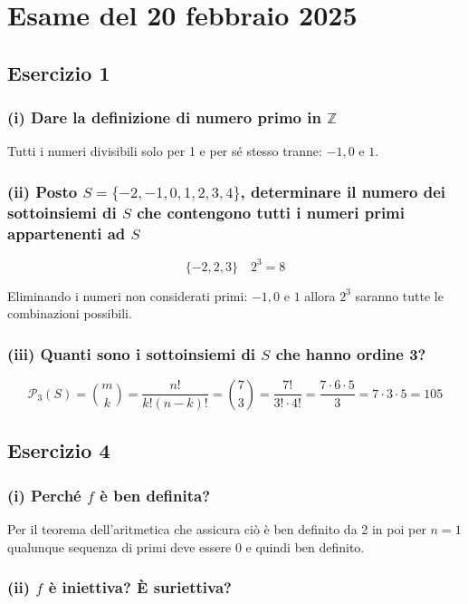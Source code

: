 \section {Esame del 20 febbraio 2025}

\subsection*{Esercizio 1}

\subsubsection*{(i) Dare la definizione di numero primo in $\mathbb{Z}$}

Tutti i numeri divisibili solo per 1 e per sé stesso tranne: $-1, 0$ e $1$.

\subsubsection*{(ii) Posto $S = \{-2, -1, 0, 1, 2, 3, 4\}$, determinare il numero dei sottoinsiemi di $S$ che contengono tutti i numeri primi appartenenti ad $S$}

$$\{-2, 2, 3\} \quad 2^3 = 8$$

Eliminando i numeri non considerati primi: $-1, 0$ e $1$ allora $2^3$ saranno tutte le combinazioni possibili.

\subsubsection*{(iii) Quanti sono i sottoinsiemi di $S$ che hanno ordine 3?}

$$\mathcal{P}_3(S) = \binom{m}{k} = \frac{n!}{k!(n-k)!} = \binom{7}{3} = \frac{7!}{3! \cdot 4!} = \frac{7 \cdot 6 \cdot 5}{3} = 7 \cdot 3 \cdot 5 = 105$$

\subsection*{Esercizio 4}

\subsubsection*{(i) Perché $f$ è ben definita?}

Per il teorema dell'aritmetica che assicura ciò è ben definito da 2 in poi per $n = 1$ qualunque sequenza di primi deve essere 0 e quindi ben definito.

\subsubsection*{(ii) $f$ è iniettiva? È suriettiva?}

